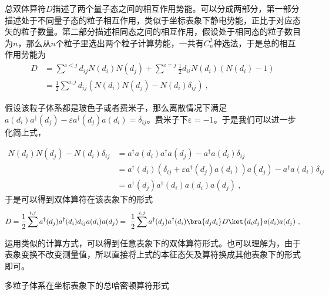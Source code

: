 总双体算符$D$描述了两个量子态之间的相互作用势能。可以分成两部分，第一部分描述处于不同量子态的粒子相互作用，类似于坐标表象下静电势能，正比于对应态矢的粒子数量。第二部分描述相同态之间的相互作用，假设处于相同态的粒子数目为$n$，那么从$n$个粒子里选出两个粒子计算势能，一共有$C_n^2$种选法，于是总的相互作用势能为
\begin{equation}
\begin{aligned}
D&=\sum^{i<j}d_{ij}N(d_i)N(d_j)+\sum^{i=j}\frac{1}{2}d_{ii}N(d_i)(N(d_i)-1)\\
&=\frac{1}{2}\sum^{i,j} d_{ij}(N(d_i)N(d_j)-N(d_i)\delta_{ij})~,
\end{aligned}
\end{equation}

假设该粒子体系都是玻色子或者费米子，那么离散情况下满足$a(d_i)a^{\dagger}(d_j)-\varepsilon a^{\dagger}(d_j)a(d_i)=\delta_{ij}$。费米子下$\mathrm{\varepsilon}=-1$。于是我们可以进一步化简上式，

\begin{equation}
\begin{aligned}
N(d_i)N(d_j)-N(d_i)\delta_{ij}&=a^\dagger a(d_i)a^\dagger a(d_j)-a^\dagger a(d_i)\delta_{ij}\\
&=a^\dagger (d_i)\left(\delta_{ij}+\varepsilon a^{\dagger}(d_j)a(d_i)\right)a(d_j)-a^\dagger a(d_i)\delta_{ij}\\
&=a^\dagger(d_j)a^\dagger(d_i)a(d_i)a(d_j)~,
\end{aligned}
\end{equation}
于是可以得到双体算符在该表象下的形式
\begin{equation}
D=\frac{1}{2}\sum ^{i,j}a^\dagger(d_j)a^\dagger(d_i) d_{ij}a(d_i)a(d_j)=~\frac{1}{2}\sum ^{i,j}a^\dagger(d_j)a^\dagger(d_i)\bra{d_jd_i}D\ket{d_id_j}a(d_i)a(d_j)~,
\end{equation}

运用类似的计算方式，可以得到任意表象下的双体算符形式。也可以理解为，由于表象变换不改变测量值，所以直接将上式的本征态矢及算符换成其他表象下的形式即可。

\begin{exercise}{}
多粒子体系在坐标表象下的总哈密顿算符形式
\end{exercise}




